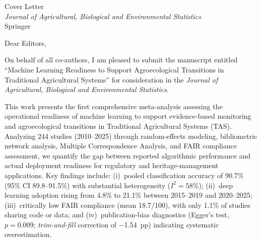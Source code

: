 \documentclass[12pt]{article}
\begin{document}
\noindent
Cover Letter\\
\textit{Journal of Agricultural, Biological and Environmental Statistics}\\
Springer

\vspace{18pt}

\noindent
Dear Editors,

\vspace{12pt}

\noindent
On behalf of all co-authors, I am pleased to submit the manuscript entitled ``Machine Learning Readiness to Support Agroecological Transitions in Traditional Agricultural Systems'' for consideration in the \textit{Journal of Agricultural, Biological and Environmental Statistics}.

\vspace{6pt}

\noindent
This work presents the first comprehensive meta-analysis assessing the operational readiness of machine learning to support evidence-based monitoring and agroecological transitions in Traditional Agricultural Systems (TAS). Analyzing 244 studies (2010--2025) through random-effects modeling, bibliometric network analysis, Multiple Correspondence Analysis, and FAIR compliance assessment, we quantify the gap between reported algorithmic performance and actual deployment readiness for regulatory and heritage-management applications. Key findings include: (i)~pooled classification accuracy of 90.7\% (95\% CI 89.8--91.5\%) with substantial heterogeneity ($I^{2} = 58\%$); (ii)~deep learning adoption rising from 4.8\% to 21.1\% between 2015--2019 and 2020--2025; (iii)~critically low FAIR compliance (mean 18.7/100), with only 1.1\% of studies sharing code or data; and (iv)~publication-bias diagnostics (Egger's test, $p = 0.009$; \textit{trim-and-fill} correction of $-$1.54~pp) indicating systematic overestimation.

\vspace{6pt}
\end{document}
